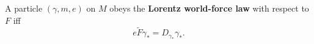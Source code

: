 A particle $(\gamma, m, e)$ on $M$ obeys the \textbf{Lorentz world-force law} with respect to $F$ iff
$$e\tilde{F}\gamma_* = D_{\gamma_*}\gamma_*.$$
